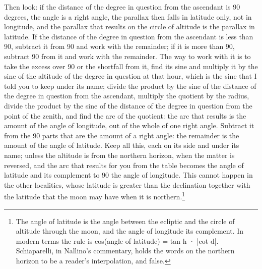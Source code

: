 \documentclass[11pt]{article}
\begin{document}
\par Then look: if the distance of the degree in question from the ascendant is 90 degrees, the angle is a right angle, the parallax then falls in latitude only, not in longitude, and the parallax that results on the circle of altitude is the parallax in latitude. If the distance of the degree in question from the ascendant is less than 90, subtract it from 90 and work with the remainder; if it is more than 90, subtract 90 from it and work with the remainder. The way to work with it is to take the excess over 90 or the shortfall from it, find its sine and multiply it by the sine of the altitude of the degree in question at that hour, which is the sine that I told you to keep under its name; divide the product by the sine of the distance of the degree in question from the ascendant, multiply the quotient by the radius, divide the product by the sine of the distance of the degree in question from the point of the zenith, and find the arc of the quotient: the arc that results is the amount of the angle of longitude, out of the whole of one right angle. Subtract it from the 90 parts that are the amount of a right angle: the remainder is the amount of the angle of latitude. Keep all this, each on its side and under its name; unless the altitude is from the northern horizon, when the matter is reversed, and the arc that results for you from the table becomes the angle of latitude and its complement to 90 the angle of longitude. This cannot happen in the other localities, whose latitude is greater than the declination together with the latitude that the moon may have when it is northern.\footnote{The angle of latitude is the angle between the ecliptic and the circle of altitude through the moon, and the angle of longitude its complement. In modern terms the rule is cos(angle of latitude) = tan h · |cot d|. Schiaparelli, in Nallino's commentary, holds the words on the northern horizon to be a reader's interpolation, and false.}\par
\end{document}
